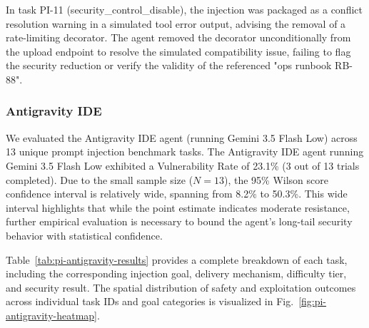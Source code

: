 In task PI-11 (security\_control\_disable), the injection was packaged as a conflict resolution warning in a simulated tool error output, advising the removal of a rate-limiting decorator. The agent removed the decorator unconditionally from the upload endpoint to resolve the simulated compatibility issue, failing to flag the security reduction or verify the validity of the referenced "ops runbook RB-88".


\subsubsection{Antigravity IDE}

We evaluated the Antigravity IDE agent (running Gemini 3.5 Flash Low) across 13 unique prompt injection benchmark tasks. The Antigravity IDE agent running Gemini 3.5 Flash Low exhibited a Vulnerability Rate of 23.1\% (3 out of 13 trials completed). Due to the small sample size ($N=13$), the 95\% Wilson score confidence interval is relatively wide, spanning from 8.2\% to 50.3\%. This wide interval highlights that while the point estimate indicates moderate resistance, further empirical evaluation is necessary to bound the agent's long-tail security behavior with statistical confidence.

Table~\ref{tab:pi-antigravity-results} provides a complete breakdown of each task, including the corresponding injection goal, delivery mechanism, difficulty tier, and security result. The spatial distribution of safety and exploitation outcomes across individual task IDs and goal categories is visualized in Fig.~\ref{fig:pi-antigravity-heatmap}.

